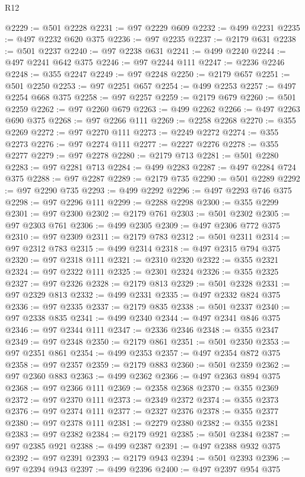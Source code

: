 \begin{lexlean}{R12}
\begin{coremodule}
{{{{{{{{{{{{{{{{{{{{{{{{{{{{{{{{{{{{{{{{{{{{{{{{{{{{{{{{{{{{{{{{{{{{{{{{{{{{{{{{{{@2229 := @501 @2228
@2231 := @97 @2229 @609
@2232 := @499 @2231
@2235 := @497 @2232 @620 @375
@2236 := @97 @2235
@2237 := @2179 @631
@2238 := @501 @2237
@2240 := @97 @2238 @631
@2241 := @499 @2240
@2244 := @497 @2241 @642 @375
@2246 := @97 @2244 @111
@2247 := @2236 @2246
@2248 := @355 @2247
@2249 := @97 @2248
@2250 := @2179 @657
@2251 := @501 @2250
@2253 := @97 @2251 @657
@2254 := @499 @2253
@2257 := @497 @2254 @668 @375
@2258 := @97 @2257
@2259 := @2179 @679
@2260 := @501 @2259
@2262 := @97 @2260 @679
@2263 := @499 @2262
@2266 := @497 @2263 @690 @375
@2268 := @97 @2266 @111
@2269 := @2258 @2268
@2270 := @355 @2269
@2272 := @97 @2270 @111
@2273 := @2249 @2272
@2274 := @355 @2273
@2276 := @97 @2274 @111
@2277 := @2227 @2276
@2278 := @355 @2277
@2279 := @97 @2278
@2280 := @2179 @713
@2281 := @501 @2280
@2283 := @97 @2281 @713
@2284 := @499 @2283
@2287 := @497 @2284 @724 @375
@2288 := @97 @2287
@2289 := @2179 @735
@2290 := @501 @2289
@2292 := @97 @2290 @735
@2293 := @499 @2292
@2296 := @497 @2293 @746 @375
@2298 := @97 @2296 @111
@2299 := @2288 @2298
@2300 := @355 @2299
@2301 := @97 @2300
@2302 := @2179 @761
@2303 := @501 @2302
@2305 := @97 @2303 @761
@2306 := @499 @2305
@2309 := @497 @2306 @772 @375
@2310 := @97 @2309
@2311 := @2179 @783
@2312 := @501 @2311
@2314 := @97 @2312 @783
@2315 := @499 @2314
@2318 := @497 @2315 @794 @375
@2320 := @97 @2318 @111
@2321 := @2310 @2320
@2322 := @355 @2321
@2324 := @97 @2322 @111
@2325 := @2301 @2324
@2326 := @355 @2325
@2327 := @97 @2326
@2328 := @2179 @813
@2329 := @501 @2328
@2331 := @97 @2329 @813
@2332 := @499 @2331
@2335 := @497 @2332 @824 @375
@2336 := @97 @2335
@2337 := @2179 @835
@2338 := @501 @2337
@2340 := @97 @2338 @835
@2341 := @499 @2340
@2344 := @497 @2341 @846 @375
@2346 := @97 @2344 @111
@2347 := @2336 @2346
@2348 := @355 @2347
@2349 := @97 @2348
@2350 := @2179 @861
@2351 := @501 @2350
@2353 := @97 @2351 @861
@2354 := @499 @2353
@2357 := @497 @2354 @872 @375
@2358 := @97 @2357
@2359 := @2179 @883
@2360 := @501 @2359
@2362 := @97 @2360 @883
@2363 := @499 @2362
@2366 := @497 @2363 @894 @375
@2368 := @97 @2366 @111
@2369 := @2358 @2368
@2370 := @355 @2369
@2372 := @97 @2370 @111
@2373 := @2349 @2372
@2374 := @355 @2373
@2376 := @97 @2374 @111
@2377 := @2327 @2376
@2378 := @355 @2377
@2380 := @97 @2378 @111
@2381 := @2279 @2380
@2382 := @355 @2381
@2383 := @97 @2382
@2384 := @2179 @921
@2385 := @501 @2384
@2387 := @97 @2385 @921
@2388 := @499 @2387
@2391 := @497 @2388 @932 @375
@2392 := @97 @2391
@2393 := @2179 @943
@2394 := @501 @2393
@2396 := @97 @2394 @943
@2397 := @499 @2396
@2400 := @497 @2397 @954 @375
}}}}}}}}}}}}}}}}}}}}}}}}}}}}}}}}}}}}}}}}}}}}}}}}}}}}}}}}}}}}}}}}}}}}}}}}}}}}}}}}}}
\end{coremodule}
\end{lexlean}
